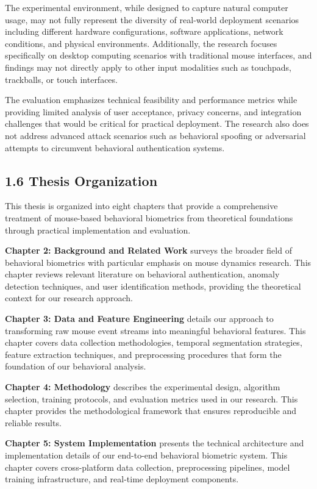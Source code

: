 \documentclass[
  11pt,
  a4paper,
]{article}
\begin{document}
The experimental environment, while designed to capture natural computer
usage, may not fully represent the diversity of real-world deployment
scenarios including different hardware configurations, software
applications, network conditions, and physical environments.
Additionally, the research focuses specifically on desktop computing
scenarios with traditional mouse interfaces, and findings may not
directly apply to other input modalities such as touchpads, trackballs,
or touch interfaces.

The evaluation emphasizes technical feasibility and performance metrics
while providing limited analysis of user acceptance, privacy concerns,
and integration challenges that would be critical for practical
deployment. The research also does not address advanced attack scenarios
such as behavioral spoofing or adversarial attempts to circumvent
behavioral authentication systems.

\subsection{1.6 Thesis Organization}\label{thesis-organization}

This thesis is organized into eight chapters that provide a
comprehensive treatment of mouse-based behavioral biometrics from
theoretical foundations through practical implementation and evaluation.

\textbf{Chapter 2: Background and Related Work} surveys the broader
field of behavioral biometrics with particular emphasis on mouse
dynamics research. This chapter reviews relevant literature on
behavioral authentication, anomaly detection techniques, and user
identification methods, providing the theoretical context for our
research approach.

\textbf{Chapter 3: Data and Feature Engineering} details our approach to
transforming raw mouse event streams into meaningful behavioral
features. This chapter covers data collection methodologies, temporal
segmentation strategies, feature extraction techniques, and
preprocessing procedures that form the foundation of our behavioral
analysis.

\textbf{Chapter 4: Methodology} describes the experimental design,
algorithm selection, training protocols, and evaluation metrics used in
our research. This chapter provides the methodological framework that
ensures reproducible and reliable results.

\textbf{Chapter 5: System Implementation} presents the technical
architecture and implementation details of our end-to-end behavioral
biometric system. This chapter covers cross-platform data collection,
preprocessing pipelines, model training infrastructure, and real-time
deployment components.
\end{document}
